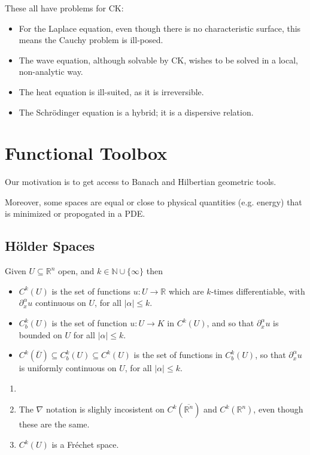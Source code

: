 \documentclass[12pt]{article}
\begin{document}

These all have problems for CK:
\begin{itemize}
	\item For the Laplace equation, even though there is no characteristic surface, this means the Cauchy problem is ill-posed.
	\item The wave equation, although solvable by CK, wishes to be solved in a local, non-analytic way.
	\item The heat equation is ill-suited, as it is irreversible.
	\item The Schr\"odinger equation is a hybrid; it is a dispersive relation.
\end{itemize}

\newpage

\section{Functional Toolbox}%
\label{sec:ft}

Our motivation is to get access to Banach and Hilbertian geometric tools.

Moreover, some spaces are equal or close to physical quantities (e.g. energy) that is minimized or propogated in a PDE.

\subsection{H\"older Spaces}%
\label{sub:hs}

\begin{definition}
	Given $U \subseteq \mathbb{R}^n$ open, and $k \in \mathbb{N} \cup \{ \infty\}$ then
	\begin{itemize}
		\item $C^{k}(U)$ is the set of functions $u : U \to \mathbb{R}$ which are $k$-times differentiable, with $\partial^{\alpha}_x u$ continuous on $U$, for all $|\alpha| \leq k$.
		\item $C^{k}_b(U)$ is the set of function $u : U \to K$ in $C^{k}(U)$, and so that $\partial^{\alpha}_x u$ is bounded on $U$ for all $|\alpha| \leq k$.
		\item $C^{k}(\bar U) \subseteq C^{k}_b(U) \subseteq C^{k}(U)$ is the set of functions in $C^{k}_b(U)$, so that $\partial^{\alpha}_x u$ is uniformly continuous on $U$, for all $|\alpha| \leq k$.
	\end{itemize}
\end{definition}

\begin{remark}
	\begin{enumerate}
		\item[]
		\item The $\nabla$ notation is slighly incosistent on $C^k(\overline{\mathbb{R}^n})$ and $C^k(\mathbb{R}^n)$, even though these are the same.
		\item $C^{k}(U)$ is a Fr\'echet space.
	\end{enumerate}
\end{remark}
\end{document}
